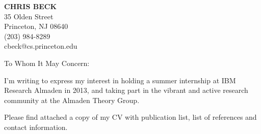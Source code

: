 \documentclass{letter}
\begin{document}
\signature{Chris Beck}                  %
\longindentation=0pt                     %
\let\raggedleft\raggedright              %
 
\begin{letter}{%
} 

\begin{center}
{\large\bf CHRIS BECK} \\
{35 Olden Street \\ Princeton, NJ 08640  \\ (203) 984-8289} \\ cbeck@cs.princeton.edu \\
\end{center} \vfill %
 

\opening{To Whom It May Concern:} 

\noindent I'm writing to express my interest in holding a summer internship at IBM Research Almaden in 2013, and taking part in the vibrant and active research community at the Almaden Theory Group.
 
\noindent Please find attached a copy of my CV with publication list, list of references and contact information.



\end{letter}
\end{document}
